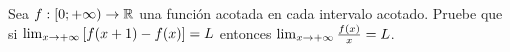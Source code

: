 
Sea $f:[0;+\infty)\to\mathbb{R}$ una función acotada en cada intervalo acotado.
Pruebe que si $\limite{x}{\left[f(x+1)-f(x)\right]}=L$ entonces $\limite{x}{\frac{f(x)}{x}}=L$.
